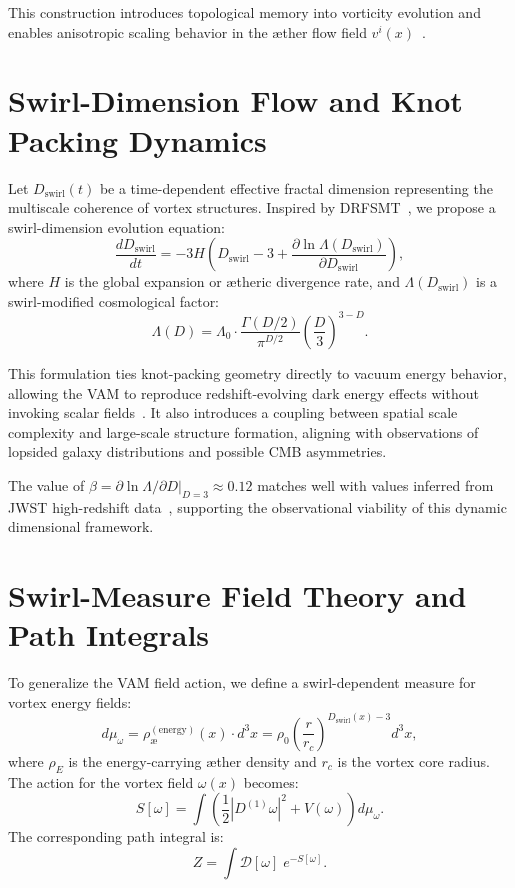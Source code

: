 \documentclass[11pt]{article}
\begin{document}
    This construction introduces topological memory into vorticity evolution and enables anisotropic scaling behavior in the æther flow field \( v^i(x) \)~\cite{zhou2025drfsmt}.

    \section{Swirl-Dimension Flow and Knot Packing Dynamics}

    Let \( D_\text{swirl}(t) \) be a time-dependent effective fractal dimension representing the multiscale coherence of vortex structures. Inspired by DRFSMT~\cite{zhou2025drfsmt}, we propose a swirl-dimension evolution equation:
    \[
        \frac{d D_\text{swirl}}{dt} = -3H \left( D_\text{swirl} - 3 + \frac{\partial \ln \Lambda(D_\text{swirl})}{\partial D_\text{swirl}} \right),
    \]
    where \( H \) is the global expansion or ætheric divergence rate, and \( \Lambda(D_\text{swirl}) \) is a swirl-modified cosmological factor:
    \[
        \Lambda(D) = \Lambda_0 \cdot \frac{\Gamma(D/2)}{\pi^{D/2}} \left(\frac{D}{3}\right)^{3-D}.
    \]

    This formulation ties knot-packing geometry directly to vacuum energy behavior, allowing the VAM to reproduce redshift-evolving dark energy effects without invoking scalar fields~\cite{vam2024swirl}. It also introduces a coupling between spatial scale complexity and large-scale structure formation, aligning with observations of lopsided galaxy distributions and possible CMB asymmetries.

    The value of \( \beta = \partial \ln \Lambda / \partial D \big|_{D=3} \approx 0.12 \) matches well with values inferred from JWST high-redshift data~\cite{zhou2025drfsmt}, supporting the observational viability of this dynamic dimensional framework.

    \section{Swirl-Measure Field Theory and Path Integrals}

    To generalize the VAM field action, we define a swirl-dependent measure for vortex energy fields:
    \[
        d\mu_\omega = \rho_\text{\ae}^{(\text{energy})}(x) \cdot d^3x = \rho_0 \left( \frac{r}{r_c} \right)^{D_\text{swirl}(x) - 3} d^3x,
    \]
    where \( \rho_{\scriptscriptstyle\boldsymbol\!E}\) is the energy-carrying æther density and \( r_c \) is the vortex core radius. The action for the vortex field \( \omega(x) \) becomes:
    \[
        S[\omega] = \int \left( \frac{1}{2} |D^{(1)} \omega|^2 + V(\omega) \right) d\mu_\omega.
    \]
    The corresponding path integral is:
    \[
        Z = \int \mathcal{D}[\omega] \; e^{-S[\omega]}.
    \]
\end{document}
